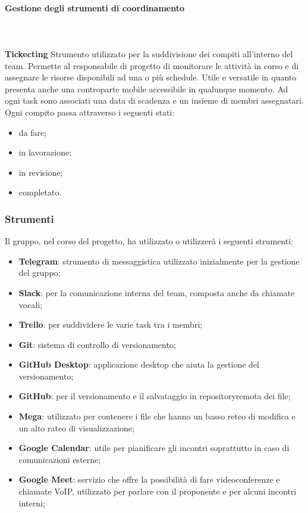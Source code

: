 			\paragraph{Gestione degli strumenti di coordinamento} \mbox{}\\ \mbox{}\\
			\textbf{Tickecting} \newline \newline
			Strumento utilizzato per la suddivisione dei compiti all'interno del team. Permette al responsabile di progetto di monitorare le attività in corso e di assegnare le risorse disponibili ad una o più schedule\glo.\newline
			Utile e versatile in quanto presenta anche una controparte mobile accessibile in qualunque momento. Ad ogni task sono associati una data di scadenza e un insieme di membri assegnatari. Ogni compito passa attraverso i seguenti stati:
			\begin{itemize}
				\item da fare;
				\item in lavorazione;
				\item in revisione;
				\item completato.
			\end{itemize}


			
		\subsubsection{Strumenti}
		Il gruppo, nel corso del progetto, ha utilizzato o utilizzerà i seguenti strumenti:
		\begin{itemize}
			\item \textbf{Telegram\glo}: strumento di messaggistica utilizzato inizialmente per la gestione del gruppo;
			\item \textbf{Slack\glo}: per la comunicazione interna del team, composta anche da chiamate vocali;
			\item \textbf{Trello\glo}: per suddividere le varie task tra i membri;
			\item \textbf{Git}: sistema di controllo di versionamento;
			\item \textbf{GitHub Desktop}: applicazione desktop che aiuta la gestione del versionamento;
			\item \textbf{GitHub}\glo: per il versionamento e il salvataggio in repository\glosp remota dei file;
			\item \textbf{Mega}: utilizzato per contenere i file che hanno un basso reteo di modifica e un alto rateo di visualizzazione;
			\item \textbf{Google Calendar}: utile per pianificare gli incontri soprattutto in caso di comunicazioni esterne;
			\item \textbf{Google Meet}: servizio che offre la possibilità di fare videoconferenze e chiamate VoIP, utilizzato per parlare con il proponente e per alcuni incontri interni;
		\end{itemize}
	
